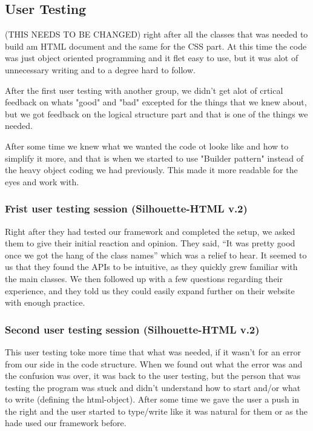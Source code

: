 \documentclass[12pt]{article}
\begin{document}
    \subsection{User Testing}


    (THIS NEEDS TO BE CHANGED)
    right after all the classes that was needed to build am HTML document and the same for the CSS part. At this time the code was just object oriented programming and it flet easy to use, but it was alot of unnecessary writing and to a degree hard to follow.   
        
    After the first user testing with another group, we didn't get alot of crtical feedback on whats "good" and "bad" excepted for the things that we knew about, but we got feedback on the logical structure part and that is one of the things we needed.
        
    After some time we knew what we wanted the code ot looke like and how to simplify it more, and that is when we started to use "Builder pattern" instead of the heavy object coding we had previously. This made it more readable for the eyes and work with.

        \subsubsection{Frist user testing session (Silhouette-HTML v.2)}
        Right after they had tested our framework and completed the setup, we asked them to give their initial reaction and opinion. They said, “It was pretty good once we got the hang of the class names” which was a relief to hear. It seemed to us that they found the APIs to be intuitive, as they quickly grew familiar with the main classes. We then followed up with a few questions regarding their experience, and they told us they could easily expand further on their website with enough practice.

        \subsubsection{Second user testing session (Silhouette-HTML v.2)}
        This user testing toke more time that what was needed, if it wasn’t for an error from our side in the code structure. When we found out what the error was and the confusion was over, it was back to the user testing, but the person that was testing the program was stuck and didn’t understand how to start and/or what to write (defining the html-object). After some time we gave the user a push in the right and the user started to type/write like it was natural for them or as the hade used our framework before.
\end{document}
